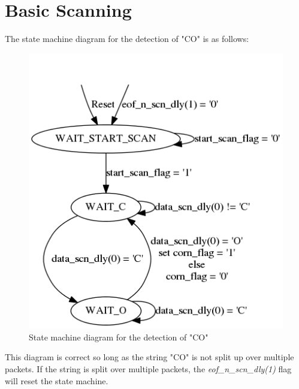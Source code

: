 \documentclass{article}
\begin{document}
\section{Basic Scanning}
The state machine diagram for the detection of "CO" is as follows:

	\begin{figure}[H]
		\begin{center}
			\includegraphics[scale=0.35]{../graphviz/part_2_state_diagram.png}
			\caption{State machine diagram for the detection of "CO"}
		\end{center}
	\end{figure}
	
This diagram is correct so long as the string "CO" is not split up over multiple packets. If the string is split over multiple packets, the \textit{eof\_n\_scn\_dly(1)} flag will reset the state machine. \\
\end{document}
